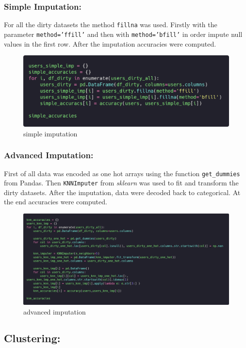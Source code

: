 \documentclass{article}
\begin{document}
\subsubsection{Simple Imputation:} For all the dirty datasets the method \texttt{fillna} was used. Firstly with the parameter \texttt{method='ffill'} and then with \texttt{method='bfill'} in order impute null values in the first row. After the imputation accuracies were computed.
\begin{figure}[h]\centering
	\includegraphics[scale=0.25]{img/simple.png}
	\caption{simple imputation}
\end{figure}
			
\subsubsection{Advanced Imputation:} First of all data was encoded as one hot arrays using the function \texttt{get\_dummies} from Pandas. Then \texttt{KNNImputer} from \emph{sklearn} was used to fit and transform the dirty datasets. After the imputation, data were decoded back to categorical. At the end accuracies were computed.
\begin{figure}[h]\centering
	\includegraphics[scale=0.2]{img/knn_imputation.png}
	\caption{advanced imputation}
\end{figure}

\subsection{Clustering:}
			
\end{document}
